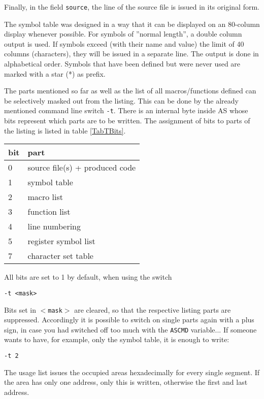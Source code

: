 \documentclass[12pt,twoside]{report}
\newcommand{\tty}[1]{{\tt #1}}
\begin{document}
Finally, in the field \tty{source}, the line of the source file is issued in 
its original form.

The symbol table was designed in a way that it can be displayed on an
80-column display whenever possible. For symbols of ''normal length'',
a double column output is used.  If symbols exceed (with their name
and value) the limit of 40 columns (characters), they will be issued
in a separate line. The output is done in alphabetical order. 
Symbols that have been defined but were never used are marked with a
star (*) as prefix.

The parts mentioned so far as well as the list of all macros/functions 
defined can be selectively masked out from the listing. 
This can be done by the already mentioned command line switch \tty{-t}. 
There is an internal byte inside AS whose bits represent which parts 
are to be written.  The assignment of bits to parts of the listing is
listed in table \ref{TabTBits}.
\par
\begin{table*}[htb]
\begin{center}\begin{tabular}{|l|l|}
\hline
bit &  part \\
\hline
\hline
0   & source file(s) + produced code \\
1   & symbol table \\
2   & macro list \\
3   & function list \\
4   & line numbering \\
5   & register symbol list \\
7   & character set table \\
\hline
\end{tabular}\end{center}
\caption{Assignment of Bits to Listing Components\label{TabTBits}}
\end{table*}
All bits are set to 1 by default, when using the switch
\begin{verbatim}
-t <mask>
\end{verbatim}
Bits set in \tty{$<$mask$>$} are cleared, so that the respective listing 
parts are suppressed.  Accordingly it is possible to switch on single 
parts again with a plus sign, in case you had switched off too much 
with the \tty{ASCMD} variable... If someone wants to have, for example, 
only the symbol table, it is enough to write:
\begin{verbatim}
-t 2  
\end{verbatim}
The usage list issues the occupied areas hexadecimally for every 
single segment.  If the area has only one address, only this is written, 
otherwise the first and last address.
\end{document}
